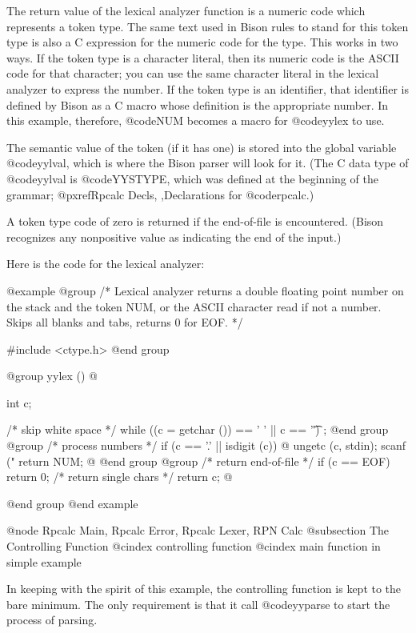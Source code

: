 {{{The return value of the lexical analyzer function is a numeric code which
represents a token type.  The same text used in Bison rules to stand for
this token type is also a C expression for the numeric code for the type.
This works in two ways.  If the token type is a character literal, then its
numeric code is the ASCII code for that character; you can use the same
character literal in the lexical analyzer to express the number.  If the
token type is an identifier, that identifier is defined by Bison as a C
macro whose definition is the appropriate number.  In this example,
therefore, @code{NUM} becomes a macro for @code{yylex} to use.

The semantic value of the token (if it has one) is stored into the global
variable @code{yylval}, which is where the Bison parser will look for it.
(The C data type of @code{yylval} is @code{YYSTYPE}, which was defined
at the beginning of the grammar; @pxref{Rpcalc Decls, ,Declarations for @code{rpcalc}}.)

A token type code of zero is returned if the end-of-file is encountered.
(Bison recognizes any nonpositive value as indicating the end of the
input.)

Here is the code for the lexical analyzer:

@example
@group
/* Lexical analyzer returns a double floating point 
   number on the stack and the token NUM, or the ASCII
   character read if not a number.  Skips all blanks
   and tabs, returns 0 for EOF. */

#include <ctype.h>
@end group

@group
yylex ()
@{
  int c;

  /* skip white space  */
  while ((c = getchar ()) == ' ' || c == '\t')  
    ;
@end group
@group
  /* process numbers   */
  if (c == '.' || isdigit (c))                
    @{
      ungetc (c, stdin);
      scanf ("%
      return NUM;
    @}
@end group
@group
  /* return end-of-file  */
  if (c == EOF)                            
    return 0;
  /* return single chars */
  return c;                                
@}
@end group
@end example

@node Rpcalc Main, Rpcalc Error, Rpcalc Lexer, RPN Calc
@subsection The Controlling Function
@cindex controlling function
@cindex main function in simple example

In keeping with the spirit of this example, the controlling function is
kept to the bare minimum.  The only requirement is that it call
@code{yyparse} to start the process of parsing.

}}}
